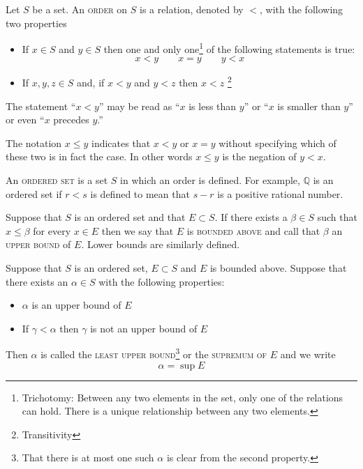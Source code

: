 \begin{definition}Let $S$ be a set.  An \textsc{order} on $S$ is a relation, denoted by $<$, with the following two properties

\begin{itemize}
	\item  If $x \in S$ and $y \in S$ then one and only one\footnote{Trichotomy: Between any two elements in the set, only one of the relations can hold.  There is a unique relationship between any two elements.} of the following statements is true:	\[	x< y \qquad x=y \qquad y<x\]  
	\item If $x,y,z \in S$ and, if $x<y$ and $y<z$ then $x<z$
	\footnote{Transitivity}
\end{itemize}
\end{definition}


The statement ``$x<y$'' may be read as ``$x$ is less than $y$'' or ``$x$ is smaller than $y$'' or even ``$x$ precedes $y$.''

The notation $x \leq y$ indicates that $x<y$ or $x=y$ without specifying which of these two is in fact the case.  In other words $x \leq y$ is the negation of $y<x$.


\begin{definition}An \textsc{ordered set} is a set $S$ in which an order is defined.  For example, $\mathbb{Q}$ is an ordered set if $r<s$ is defined to mean that $s-r$ is a positive rational number. \end{definition}



\begin{definition}Suppose that $S$ is an ordered set and that $E \subset S$.  If there exists a $\beta \in S$ such that $x \leq \beta$ for every $x \in E$ then we say that $E$ is \textsc{bounded above} and call that $\beta$ an \textsc{upper bound} of $E$.  Lower bounds are similarly defined. \end{definition}


\begin{definition} Suppose that $S$ 
is an ordered set, $E \subset S$ and $E$ is bounded above.    Suppose that there exists an $\alpha \in S$ with the following properties:
\begin{itemize}
	\item $\alpha$ is an upper bound of $E$
	\item If $\gamma< \alpha$ then $\gamma$ is not an upper bound of $E$
\end{itemize}
Then $\alpha$ is called the \textsc{least upper bound}\footnote{That there is at most one such $\alpha$ is clear from the second property.} or the \textsc{supremum of $E$} and we write
\[\alpha = \sup E\]
\end{definition}

